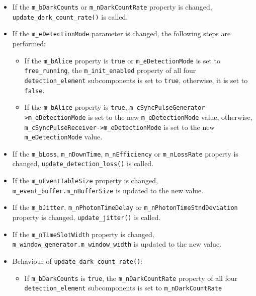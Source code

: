 \begin{itemize}

\item If the \texttt{m\_bDarkCounts} or \texttt{m\_nDarkCountRate} property is changed, \texttt{update\_dark\_count\_rate()} is called.

\item If the \texttt{m\_eDetectionMode} parameter is changed, the following steps are performed:

\begin{itemize}

\item If the \texttt{m\_bAlice} property is \texttt{true} or \texttt{m\_eDetectionMode} is set to \texttt{free\_running}, the \texttt{m\_init\_enabled} property of
all four \texttt{detection\_element} subcomponents is set to \texttt{true}, otherwise, it is set to \texttt{false}.

\item If the \texttt{m\_bAlice} property is \texttt{true}, \texttt{m\_cSyncPulseGenerator->\-m\_eDetectionMode} is set to the new \texttt{m\_eDetectionMode} value, otherwise, \texttt{m\_cSyncPulseReceiver->\-m\_eDetectionMode} is set to the new \texttt{m\_eDetectionMode} value.

\end{itemize}

\item If the \texttt{m\_bLoss}, \texttt{m\_nDownTime}, \texttt{m\_nEfficiency} or \texttt{m\_nLossRate} property is changed, \texttt{update\_detection\_loss()} is called.

\item If the \texttt{m\_nEventTableSize} property is changed, \texttt{m\_event\_buffer.m\_nBufferSize} is updated to the new value.

\item If the \texttt{m\_bJitter}, \texttt{m\_nPhotonTimeDelay} or \texttt{m\_nPhotonTimeStndDeviation} property is changed, \texttt{update\_jitter()} is called.

\item If the \texttt{m\_nTimeSlotWidth} property is changed, \texttt{m\_window\_generator.m\_window\_width} is updated to the new value.

\item Behaviour of \texttt{update\_dark\_count\_rate()}:

\begin{itemize}

\item If \texttt{m\_bDarkCounts} is \texttt{true}, the \texttt{m\_nDarkCountRate} property of all four \texttt{detection\_element} subcomponents is set to \texttt{m\_nDarkCountRate}


\end{itemize}
\end{itemize}
